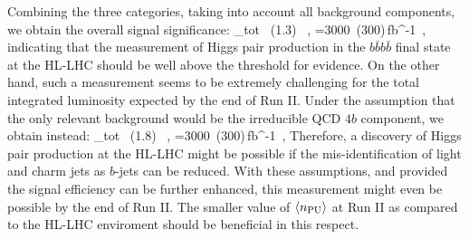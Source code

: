     
Combining the three categories, taking into
account all background components, we obtain the overall signal
significance:
\be
\lp {}\rp_{\rm tot} ~(1.3) \, ,\quad
{}=3000~(300)\,{\rm fb}^{-1}\, ,
\ee
%
indicating  that the measurement of
Higgs pair production in the $b\bar{b}b\bar{b}$ final state at the HL-LHC
should be 
well above the threshold for evidence.
%
On the other hand, such a measurement seems to be
extremely challenging
for the total integrated luminosity expected by the end of Run II.
%
Under the  assumption that
    the only relevant background would be the irreducible QCD $4b$ component,
    we obtain instead:
    \be
\lp {}\rp_{\rm tot} ~(1.8) \, ,\quad
{}=3000~(300)\,{\rm fb}^{-1}\, ,
\ee
Therefore, a discovery of Higgs pair production at the
HL-LHC might be possible if the
mis-identification of light and charm jets as
$b$-jets can be  reduced.
%
With these assumptions, and provided
the signal efficiency can be further enhanced,
this measurement might even be possible
by the end of Run II.
%
The smaller value of $\left\langle n_{\rm PU}\right\rangle$ at Run II as compared
to the HL-LHC enviroment should be beneficial in this
respect.







